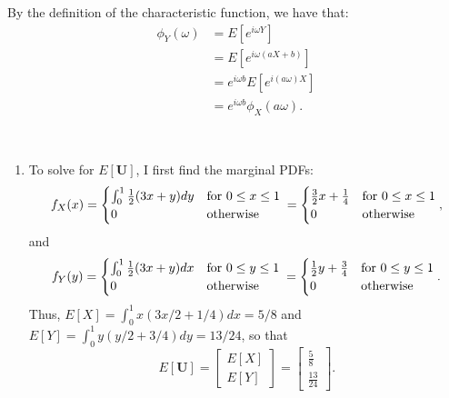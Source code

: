 \begin{problem}{12}
By the definition of the characteristic function, we have that:
\begin{align*}
\phi_Y(\omega) &= E[e^{i \omega Y}] \\
& = E[e^{i \omega (aX+b)}] \\
&= e^{i\omega b}E[e^{i(a\omega)X}] \\
&=e^{i\omega b}\phi_X(a\omega).
\end{align*}
\end{problem}

\begin{problem}{13}$ $
\begin{enumerate}
\item  To solve for $E[\bm U]$, I first find the marginal PDFs:
	\begin{equation*}  
 f_{X}(x) = \begin{cases}
                                  \int_0^1 \frac{1}{2}(3x+y)dy & \text{for $0\le x\le 1$} \\
                                  0& \text{otherwise}
       \end{cases} \\
= \begin{cases}
                                 \frac{3}{2}x+\frac{1}{4} & \text{for $0\le x\le 1$} \\
                                  0& \text{otherwise}
       \end{cases},
\end{equation*}
and
	\begin{equation*}  
 f_{Y}(y) = \begin{cases}
                                  \int_0^1 \frac{1}{2}(3x+y)dx & \text{for $0\le y\le 1$} \\
                                  0& \text{otherwise}
       \end{cases} \\
= \begin{cases}
                                 \frac{1}{2}y+\frac{3}{4} & \text{for $0\le y\le 1$} \\
                                  0& \text{otherwise}
       \end{cases}.
\end{equation*}
Thus, $E[X] = \int_0^1x(3x/2+1/4)dx = 5/8$ and $E[Y] = \int_0^1y(y/2+3/4)dy = 13/24$, so that
\begin{equation*}
E[\bm U]  =\begin{bmatrix} E[X] \\ E[Y] \end{bmatrix}= \left[\begin{matrix}
    \frac{5}{8}  \\[6pt]
    \frac{13}{24}
\end{matrix}\right].
\end{equation*}


\end{enumerate}
\end{problem}
